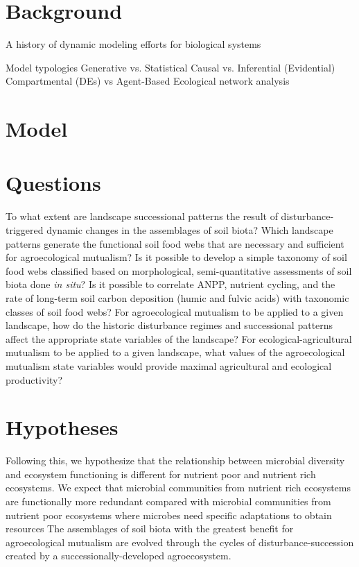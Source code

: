 
\section{Background}
A history of dynamic modeling efforts for biological systems
\begin{outline}[enumerate]
 \1 Model typologies
 \2 Generative vs. Statistical
 \2 Causal vs. Inferential (Evidential)
 \2 Compartmental (DEs) vs Agent-Based
 \2 Ecological network analysis
\end{outline}  
 
 \section {Model }
 
 
 
 
\section{Questions}
\begin{outline}
\1 To what extent are landscape successional patterns the result of disturbance-triggered dynamic changes in the assemblages of soil biota?
\1 Which landscape patterns generate the functional soil food webs that are necessary and sufficient for agroecological mutualism?
\1 Is it possible to develop a simple taxonomy of soil food webs classified based on morphological, semi-quantitative assessments of soil biota done \textit{in situ}?
\1 Is it possible to correlate ANPP, nutrient cycling, and the rate of long-term soil carbon deposition (humic and fulvic acids) with taxonomic classes of soil food webs?
\1 For agroecological mutualism to be applied to a given landscape, how do the historic disturbance regimes and successional patterns affect the appropriate state variables of the landscape?
\1 For ecological-agricultural mutualism to be applied to a given landscape, what values of the agroecological mutualism state variables would provide maximal agricultural and ecological productivity?
\end{outline}


\section{Hypotheses}
\begin{outline}[enumerate]
\1 Following this, we hypothesize that the relationship between microbial diversity and ecosystem
functioning is different for nutrient poor and nutrient rich ecosystems. We expect that microbial
communities from nutrient rich ecosystems are functionally more redundant compared with
microbial communities from nutrient poor ecosystems where microbes need specific adaptations
to obtain resources \citep{van_der_heijden_unseen_2008}
\1 The assemblages of soil biota with the greatest benefit for agroecological mutualism are evolved through the cycles of disturbance-succession created by a successionally-developed agroecosystem.
\end{outline}


